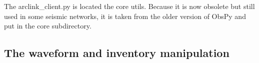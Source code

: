 \documentclass[letterpaper,10pt,english]{sphinxmanual}
\begin{document}
\sphinxAtStartPar
The arclink\_client.py is located the core utils.
Because it is now obsolete but still used in some seismic networks,
it is taken from the older version of ObsPy and put in the core subdirectory.

\subsection{The waveform and inventory manipulation}
\label{\detokenize{api_core:the-waveform-and-inventory-manipulation}}\label{\detokenize{api_core:module-amw.core.signal_utils}}
\end{document}
